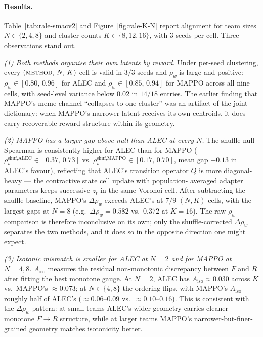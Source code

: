 \paragraph{Results.}
Table~\ref{tab:rale-smacv2} and Figure~\ref{fig:rale-K-N} report alignment
for team sizes $N\in\{2,4,8\}$ and cluster counts $K\in\{8,12,16\}$, with
$3$ seeds per cell. Three observations stand out.

\emph{(1) Both methods organise their own latents by reward.} Under
per-seed clustering, every $(\textsc{method},\,N,\,K)$ cell is valid in
$3/3$ seeds and $\rho_w$ is large and positive: $\rho_w\!\in\![0.80,\,0.96]$
for ALEC and $\rho_w\!\in\![0.85,\,0.94]$ for MAPPO across all nine cells,
with seed-level variance below $0.02$ in $14/18$ entries. The earlier
finding that MAPPO's meme channel ``collapses to one cluster'' was an
artifact of the joint dictionary: when MAPPO's narrower latent receives its
own centroids, it does carry recoverable reward structure within its
geometry.

\emph{(2) MAPPO has a larger gap above null than ALEC at every $N$.} The
shuffle-null Spearman is consistently higher for ALEC than for MAPPO
($\rho_w^{\text{shuf,ALEC}}\!\in\![0.37,\,0.73]$ vs.
$\rho_w^{\text{shuf,MAPPO}}\!\in\![0.17,\,0.70]$, mean gap
$+0.13$ in ALEC's favour), reflecting that ALEC's transition operator $Q$
is more diagonal-heavy --- the contractive state cell update with population-
averaged adapter parameters keeps successive $z_t$ in the same Voronoi
cell. After subtracting the shuffle baseline, MAPPO's
$\Delta\rho_w$ exceeds ALEC's at $7/9$ $(N,K)$ cells, with the largest
gaps at $N\!=\!8$ (e.g.\ $\Delta\rho_w\!=\!0.582$ vs.\ $0.372$ at $K\!=\!16$).
The raw-$\rho_w$ comparison is therefore inconclusive on its own; only the
shuffle-corrected $\Delta\rho_w$ separates the two methods, and it does so
in the opposite direction one might expect.

\emph{(3) Isotonic mismatch is smaller for ALEC at $N\!=\!2$ and for MAPPO
at $N\!=\!4,8$.} $A_{\mathrm{iso}}$ measures the residual non-monotonic
discrepancy between $F$ and $R$ after fitting the best monotone gauge. At
$N\!=\!2$, ALEC has $A_{\mathrm{iso}}\!\approx\!0.030$ across $K$ vs.\
MAPPO's $\approx\!0.073$; at $N\!\in\!\{4,8\}$ the ordering flips, with
MAPPO's $A_{\mathrm{iso}}$ roughly half of ALEC's
($\approx\!0.06$--$0.09$ vs.\ $\approx\!0.10$--$0.16$). This is consistent
with the $\Delta\rho_w$ pattern: at small teams ALEC's wider geometry
carries cleaner monotone $F\!\to\!R$ structure, while at larger teams MAPPO's
narrower-but-finer-grained geometry matches isotonicity better.


